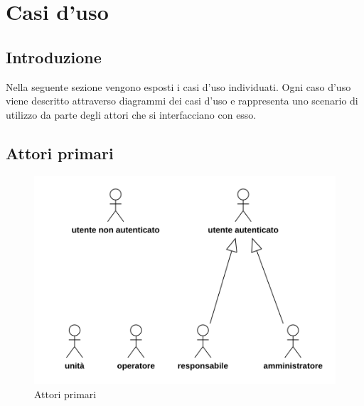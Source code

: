 \section{Casi d'uso}
\subsection{Introduzione}
Nella seguente sezione vengono esposti i casi d'uso individuati. Ogni caso d'uso viene descritto attraverso diagrammi dei casi d'uso e rappresenta uno scenario di utilizzo da parte degli attori che si interfacciano con esso.
\subsection{Attori primari}
\begin{figure}[H]
	\centering
	\includegraphics[scale=0.75]{res/images/gerarchia.png}
	\caption{Attori primari}
\end{figure}
